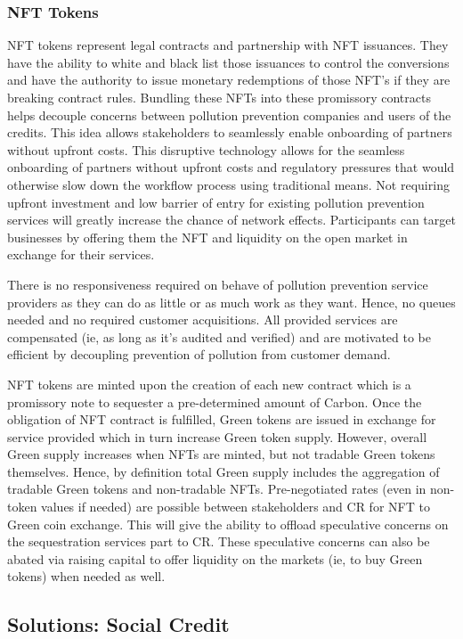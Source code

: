 \documentclass{article}
\begin{document}
\subsubsection{NFT Tokens}

NFT tokens represent legal contracts and partnership with NFT issuances. They have the ability to white and black list those issuances to control the conversions and have the authority to issue monetary redemptions of those NFT’s if they are breaking contract rules. Bundling these NFTs into these promissory contracts helps decouple concerns between pollution prevention companies and users of the credits. This idea allows stakeholders to seamlessly enable onboarding of partners without upfront costs. This disruptive technology allows for the seamless onboarding of partners without upfront costs and regulatory pressures that would otherwise slow down the workflow process using traditional means. Not requiring upfront investment and low barrier of entry for existing pollution prevention services will greatly increase the chance of network effects. Participants can target businesses by offering them the NFT and liquidity on the open market in exchange for their services. 

There is no responsiveness required on behave of pollution prevention service providers as they can do as little or as much work as they want. Hence, no queues needed and no required customer acquisitions. All provided services are compensated (ie, as long as it's audited and verified) and are motivated to be efficient by decoupling prevention of pollution from customer demand.

NFT tokens are minted upon the creation of each new contract which is a promissory note to sequester a pre-determined amount of Carbon. Once the obligation of NFT contract is fulfilled, Green tokens are issued in exchange for service provided which in turn increase Green token supply. However, overall Green supply increases when NFTs are minted, but not tradable Green tokens themselves. Hence, by definition total Green supply includes the aggregation of tradable Green tokens and non-tradable NFTs. Pre-negotiated rates (even in non-token values if needed) are possible between stakeholders and CR for NFT to Green coin exchange. This will give the ability to offload speculative concerns on the sequestration services part to CR. These speculative concerns can also be abated via raising capital to offer liquidity on the markets (ie, to buy Green tokens) when needed as well.

\subsection{Solutions: Social Credit}
\end{document}
